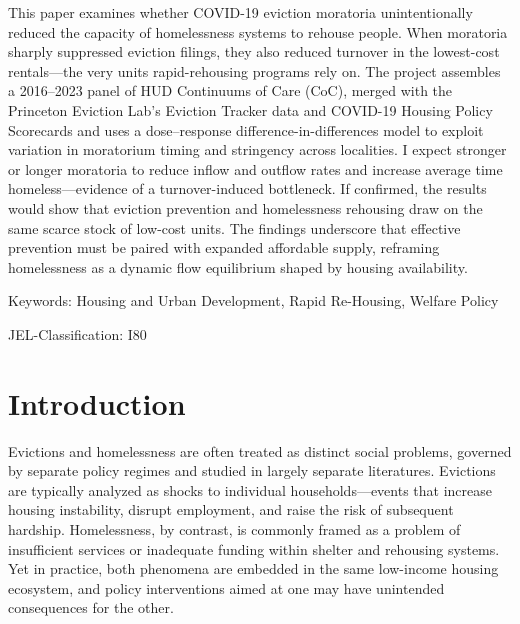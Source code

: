 \documentclass[12pt]{article}
\begin{document}


\makeacademicpage
\noindent This paper examines whether COVID-19 eviction moratoria unintentionally reduced the capacity of homelessness systems to rehouse people. When moratoria sharply suppressed eviction filings, they also reduced turnover in the lowest-cost rentals—the very units rapid-rehousing programs rely on. The project assembles a 2016–2023 panel of HUD Continuums of Care (CoC), merged with the Princeton Eviction Lab's Eviction Tracker data and COVID-19 Housing Policy Scorecards and uses a dose–response difference-in-differences model to exploit variation in moratorium timing and stringency across localities. I expect stronger or longer moratoria to reduce inflow and outflow rates and increase average time homeless—evidence of a turnover-induced bottleneck. If confirmed, the results would show that eviction prevention and homelessness rehousing draw on the same scarce stock of low-cost units. The findings underscore that effective prevention must be paired with expanded affordable supply, reframing homelessness as a dynamic flow equilibrium shaped by housing availability.

\par\vspace{4em}\noindent
{\color{zinc700}Keywords: Housing and Urban Development, Rapid Re-Housing, Welfare Policy} 
\par\noindent
{\color{zinc700}JEL-Classification: I80} 

\newpage

\section{Introduction}
Evictions and homelessness are often treated as distinct social problems, governed by separate policy regimes and studied in largely separate literatures. Evictions are typically analyzed as shocks to individual households—events that increase housing instability, disrupt employment, and raise the risk of subsequent hardship. Homelessness, by contrast, is commonly framed as a problem of insufficient services or inadequate funding within shelter and rehousing systems. Yet in practice, both phenomena are embedded in the same low-income housing ecosystem, and policy interventions aimed at one may have unintended consequences for the other.
\end{document}
